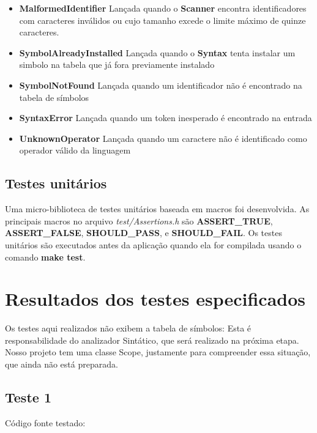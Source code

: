 \documentclass[11pt]{article}
\begin{document}
		\begin{itemize}
			
			\item \textbf{MalformedIdentifier} Lançada quando o \textbf{Scanner} encontra identificadores com caracteres inválidos
			ou cujo tamanho excede o limite máximo de quinze caracteres.
			
			\item \textbf{SymbolAlreadyInstalled} Lançada quando o \textbf{Syntax} tenta instalar um simbolo na tabela que já
			fora previamente instalado
			
			\item \textbf{SymbolNotFound} Lançada quando um identificador não é encontrado na tabela de símbolos
			
			\item \textbf{SyntaxError} Lançada quando um token inesperado é encontrado na entrada
			
			\item \textbf{UnknownOperator} Lançada quando um caractere não é identificado como operador válido da linguagem
		\end{itemize}
		
	\subsection{Testes unitários}
	Uma micro-biblioteca de testes unitários baseada em macros foi desenvolvida. 
	As principais macros no arquivo \textit{test/Assertions.h} são 
	\textbf{ASSERT\_TRUE}, \textbf{ASSERT\_FALSE}, \textbf{SHOULD\_PASS}, e \textbf{SHOULD\_FAIL}.
	Os testes unitários são executados antes da aplicação quando ela for compilada usando o comando \textbf{make test}.
  
\newpage
\section{Resultados dos testes especificados}

	Os testes aqui realizados não exibem a tabela de símbolos: Esta é responsabilidade do analizador Sintático, que será realizado na próxima etapa.
	Nosso projeto tem uma classe Scope, justamente para compreender essa situação, que ainda não está preparada.


	\subsection{Teste 1}
	
		Código fonte testado:
		
			
\end{document}

